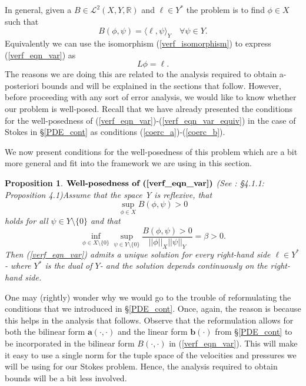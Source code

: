 \documentclass[12pt,a4paper]{article}
\newtheorem{proposition}[theorem]{Proposition}
\theoremstyle{definition}
\begin{document}
In general, given a $B\in \mathcal{L}^2\left(X,Y,\mathbb{R}\right)$ and $\ell \in Y^*$ the problem is to find $\phi \in X$ such that 
\begin{equation}\label{verf_eqn_var}
B\left(\phi,\psi\right)=\langle\ell,\psi\rangle_Y\quad \forall \psi \in Y.
\end{equation}
Equivalently we can use the isomorphism (\ref{verf_isomorphism}) to express (\ref{verf_eqn_var}) as
\begin{equation}\label{verf_eqn_var_equiv}
L\phi=\ell.
\end{equation}
The reasons we are doing this are related to the analysis required to obtain a-posteriori bounds and will be explained in the sections that follow.  However, before proceeding with any sort of error analysis, we would like to know whether our problem is well-posed.   Recall that we have already presented the conditions for the well-posedness of (\ref{verf_eqn_var})-(\ref{verf_eqn_var_equiv}) in the case of Stokes in \S \ref{PDE_cont} as conditions (\ref{coerc_a})-(\ref{coerc_b}).

We now present conditions for the well-posedness of this problem which are a bit more general and fit into the framework we are using in this section.  
\begin{proposition}{$\textbf{Well-posedness of (\ref{verf_eqn_var})}$} (See \cite{verfurth2013posteriori}: \S 4.1.1: Proposition 4.1)\label{prop_well_pos_verf}
Assume that the space Y is reflexive, that
\begin{equation}
	\sup_{\phi \in X}B\left(\phi,\psi\right)>0
\end{equation}
holds for all $\psi\in Y\setminus \lbrace 0 \rbrace$ and that
\begin{equation}
	\inf_{\phi\in X\setminus \lbrace0\rbrace}\sup_{\psi \in Y\setminus \lbrace0\rbrace}\frac{B\left(\phi,\psi\right)>0}{\left|\left|\phi\right|\right|_X\left|\left|\psi\right|\right|_Y}=\beta > 0.
\end{equation}
Then (\ref{verf_eqn_var}) admits a unique solution for every right-hand side $\ell\in Y^*$ - where $Y^*$ is the dual of $Y$- and the solution depends continuously on the right-hand side.
\end{proposition}
One may (rightly) wonder why we would go to the trouble of reformulating the conditions that we introduced in \S \ref{PDE_cont}.  Once, again, the reason is because this helps in the analysis that follows.  Observe that the reformulation allows for both the bilinear form $\textbf{a}\left(\cdot,\cdot\right)$ and the linear form $\textbf{b}\left(\cdot\right)$ from \S \ref{PDE_cont} to be incorporated in the bilinear form $B\left(\cdot,\cdot\right)$ in (\ref{verf_eqn_var}).  This will make it easy to use a single norm for the tuple space of the velocities and pressures we will be using for our Stokes problem.  Hence, the analysis required to obtain bounds will be a bit less involved. 
\end{document}
